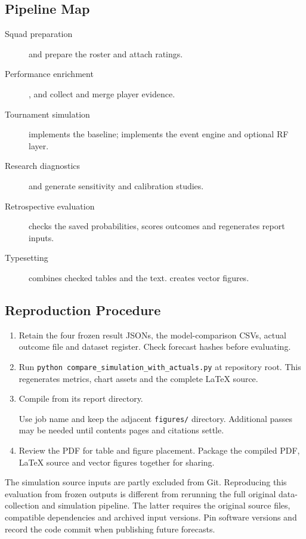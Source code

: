 \documentclass[11pt,a4paper]{article}
\begin{document}
\subsection{Pipeline Map}
{\small
\begin{description}
\item[Squad preparation]  and
 prepare the roster and attach ratings.
\item[Performance enrichment]\hfill\break {},
 and
 collect and merge player evidence.
\item[Tournament simulation]  implements the baseline;
 implements the event engine and optional RF layer.
\item[Research diagnostics]  and
 generate sensitivity and calibration studies.
\item[Retrospective evaluation]  checks the
saved probabilities, scores outcomes and regenerates report inputs.
\item[Typesetting]  combines checked tables and the
 text.  creates vector figures.
\end{description}
}
\subsection{Reproduction Procedure}
\begin{enumerate}
\item Retain the four frozen result JSONs, the model-comparison CSVs, actual
outcome file and dataset register. Check forecast hashes before evaluating.
\item Run \texttt{python compare\_simulation\_with\_actuals.py} at repository root.
This regenerates metrics, chart assets and the complete LaTeX source.
\item Compile  from its report directory.\par
Use job name  and keep the adjacent
\texttt{figures/} directory. Additional passes may be needed
until contents pages and citations settle.
\item Review the PDF for table and figure placement. Package the compiled PDF,
LaTeX source and vector figures together for sharing.
\end{enumerate}
The simulation source inputs are partly excluded from Git. Reproducing this
evaluation from frozen outputs is different from rerunning the full original
data-collection and simulation pipeline. The latter requires the original source
files, compatible dependencies and archived input versions. Pin software
versions and record the code commit when publishing future forecasts.
\end{document}
